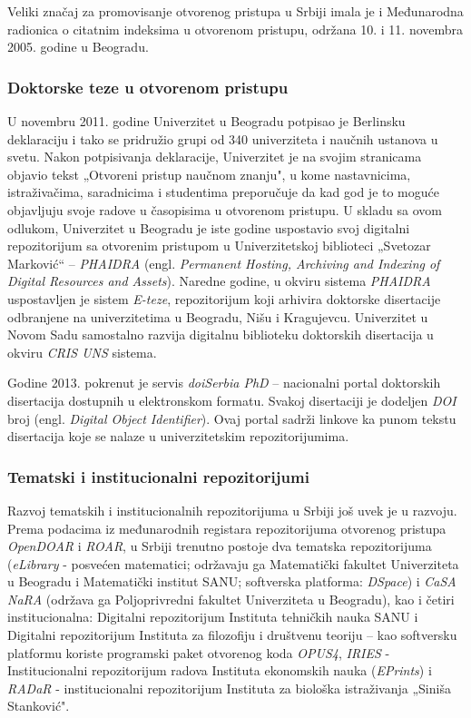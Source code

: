 \documentclass{article}
\begin{document}
Veliki značaj za promovisanje otvorenog pristupa u Srbiji imala je i Međunarodna radionica o citatnim indeksima u otvorenom pristupu, održana 10. i 11. novembra 2005. godine u Beogradu.

\subsubsection{Doktorske teze u otvorenom pristupu}

U novembru 2011. godine Univerzitet u Beogradu potpisao je Berlinsku deklaraciju i tako se pridružio grupi od 340 univerziteta i naučnih ustanova u svetu. Nakon potpisivanja deklaracije, Univerzitet je na svojim stranicama objavio tekst „Otvoreni pristup naučnom znanju", u kome nastavnicima, istraživačima, saradnicima i studentima preporučuje da kad god je to moguće objavljuju svoje radove u časopisima u otvorenom pristupu\cite{sevkusic2017open}. U skladu sa ovom odlukom, Univerzitet u Beogradu je iste godine uspostavio svoj digitalni repozitorijum sa otvorenim pristupom u Univerzitetskoj biblioteci „Svetozar Marković“ – \textit{PHAIDRA} (engl. \textit{Permanent Hosting, Archiving and Indexing of Digital Resources and Assets}). Naredne godine, u okviru sistema \textit{PHAIDRA} uspostavljen je sistem \textit{E-teze}, repozitorijum koji arhivira doktorske disertacije odbranjene na univerzitetima u Beogradu, Nišu i Kragujevcu. Univerzitet u Novom Sadu samostalno razvija digitalnu biblioteku doktorskih disertacija u okviru \textit{CRIS UNS} sistema\cite{sevkusic2017open}.

Godine 2013. pokrenut je servis \textit{doiSerbia PhD} – nacionalni portal doktorskih disertacija dostupnih u elektronskom formatu\cite{sevkusic2017open}. Svakoj disertaciji je dodeljen \textit{DOI} broj (engl. \textit{Digital Object Identifier}). Ovaj portal sadrži linkove ka punom tekstu disertacija koje se nalaze u univerzitetskim repozitorijumima.

\subsubsection{Tematski i institucionalni repozitorijumi}

Razvoj tematskih i institucionalnih repozitorijuma u Srbiji još uvek je u razvoju. Prema podacima iz međunarodnih registara repozitorijuma otvorenog pristupa \textit{OpenDOAR} i \textit{ROAR}, u Srbiji trenutno postoje dva tematska repozitorijuma (\textit{eLibrary} - posvećen matematici; održavaju ga Matematički fakultet Univerziteta u Beogradu i Matematički institut SANU; softverska platforma: \textit{DSpace}) i \textit{CaSA NaRA} (održava ga Poljoprivredni fakultet Univerziteta u Beogradu), kao i četiri institucionalna: Digitalni repozitorijum Instituta tehničkih nauka SANU i Digitalni repozitorijum Instituta za filozofiju i društvenu teoriju – kao softversku platformu koriste programski paket otvorenog koda \textit{OPUS4}, \textit{IRIES} - Institucionalni repozitorijum radova Instituta ekonomskih nauka (\textit{EPrints}) i \textit{RADaR} - institucionalni repozitorijum Instituta za biološka istraživanja „Siniša Stanković"\cite{sevkusic2017open}.
\end{document}
